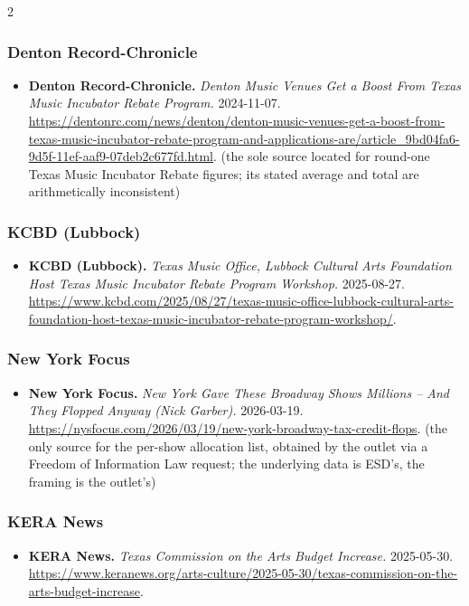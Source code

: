 {\begin{multicols}{2}
\subsubsection*{Denton Record-Chronicle}
\begin{itemize}[itemsep=0pt,topsep=1pt,parsep=0pt,partopsep=0pt,leftmargin=1em]
\item \textbf{Denton Record-Chronicle.} \textit{Denton Music Venues Get a Boost From Texas Music Incubator Rebate Program.} 2024-11-07. \url{https://dentonrc.com/news/denton/denton-music-venues-get-a-boost-from-texas-music-incubator-rebate-program-and-applications-are/article_9bd04fa6-9d5f-11ef-aaf9-07deb2c677fd.html}. {\color{ammuted}(the sole source located for round-one Texas Music Incubator Rebate figures; its stated average and total are arithmetically inconsistent)}
\end{itemize}
\subsubsection*{KCBD (Lubbock)}
\begin{itemize}[itemsep=0pt,topsep=1pt,parsep=0pt,partopsep=0pt,leftmargin=1em]
\item \textbf{KCBD (Lubbock).} \textit{Texas Music Office, Lubbock Cultural Arts Foundation Host Texas Music Incubator Rebate Program Workshop.} 2025-08-27. \url{https://www.kcbd.com/2025/08/27/texas-music-office-lubbock-cultural-arts-foundation-host-texas-music-incubator-rebate-program-workshop/}.
\end{itemize}
\subsubsection*{New York Focus}
\begin{itemize}[itemsep=0pt,topsep=1pt,parsep=0pt,partopsep=0pt,leftmargin=1em]
\item \textbf{New York Focus.} \textit{New York Gave These Broadway Shows Millions – And They Flopped Anyway (Nick Garber).} 2026-03-19. \url{https://nysfocus.com/2026/03/19/new-york-broadway-tax-credit-flops}. {\color{ammuted}(the only source for the per-show allocation list, obtained by the outlet via a Freedom of Information Law request; the underlying data is ESD’s, the framing is the outlet’s)}
\end{itemize}
\subsubsection*{KERA News}
\begin{itemize}[itemsep=0pt,topsep=1pt,parsep=0pt,partopsep=0pt,leftmargin=1em]
\item \textbf{KERA News.} \textit{Texas Commission on the Arts Budget Increase.} 2025-05-30. \url{https://www.keranews.org/arts-culture/2025-05-30/texas-commission-on-the-arts-budget-increase}.
\end{itemize}

\end{multicols}}
